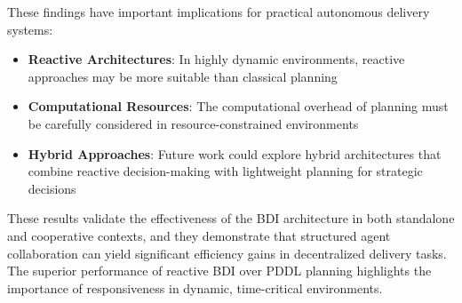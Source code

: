These findings have important implications for practical autonomous delivery systems:
\begin{itemize}
    \item \textbf{Reactive Architectures}: In highly dynamic environments, reactive approaches may be more suitable than classical planning
    \item \textbf{Computational Resources}: The computational overhead of planning must be carefully considered in resource-constrained environments
    \item \textbf{Hybrid Approaches}: Future work could explore hybrid architectures that combine reactive decision-making with lightweight planning for strategic decisions
\end{itemize}

These results validate the effectiveness of the BDI architecture in both standalone and cooperative contexts, and they demonstrate that structured agent collaboration can yield significant efficiency gains in decentralized delivery tasks. The superior performance of reactive BDI over PDDL planning highlights the importance of responsiveness in dynamic, time-critical environments.

